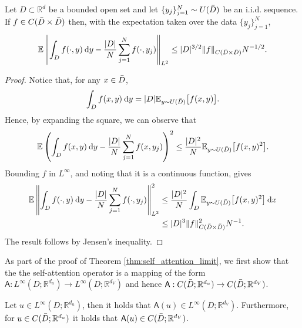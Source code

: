 \documentclass[twoside]{article}
\newcommand{\1}{\mathbbm{1}}
\newcommand{\R}{\mathbbm{R}}
\newcommand{\sA}{\mathsf{A}}
\providecommand{\mathbbm}{\mathbb} %
\newcommand{\E}{\mathbb{E}}
\begin{document}
\begin{lemma}
\label{lemma:expectation_of_l2}
Let \(D \subset \R^d\) be a bounded open set and let \(\{y_j\}_{j=1}^N \sim U(\Bar{D})\)
be an i.i.d. sequence. If \(f \in C(\Bar{D} \times \Bar{D})\)
then, with the expectation taken over the data \(\{y_j\}_{j=1}^N\),
\[ \E \left \| \int_D f(\cdot,y) \: \mathrm{d}y - \frac{|D|}{N} \sum_{j=1}^N f(\cdot,y_j) \right \|_{L^2} \leq |D|^{3/2} \|f\|_{C(\Bar{D} \times \Bar{D})} N^{-1/2}.\]
\end{lemma}
\begin{proof}
Notice that, for any \(x \in \Bar{D}\),
\[\int_D f(x,y) \: \mathrm{d}y  = |D| \E_{y \sim U(\Bar{D})} \big[ f(x,y) \big ].\]
Hence, by expanding the square, we can observe that
\[\E \left ( \int_D f(x,y) \: \mathrm{d}y - \frac{|D|}{N} \sum_{j=1}^N f(x,y_j) \right )^2 \leq \frac{|D|^2}{N} \E_{y \sim U(\Bar{D})} \big [ f(x,y)^2 \big ].\]
Bounding $f$ in $L^\infty$, and noting that it is a continuous function, gives
\begin{align*}
\E \left \| \int_D f(\cdot,y) \: \mathrm{d}y - \frac{|D|}{N} \sum_{j=1}^N f(\cdot,y_j) \right \|^2_{L^2} &\leq \frac{|D|^2}{N} \int_D \E_{y \sim U(\Bar{D})} \big [ f(x,y)^2 \big ] \: \mathrm{d}x \\
&\leq |D|^3 \|f\|^2_{C(\Bar{D} \times \Bar{D})} N^{-1} .
\end{align*}
The result follows by Jensen's inequality. 
\end{proof}
As part of the proof of Theorem \ref{thm:self_attention_limit}, we first show that the the self-attention operator is a mapping of the form $\sA: L^\infty (D;\R^{d_u}) \to L^\infty (D; \R^{d_V})$ and hence $\sA:C (\Bar{D};\R^{d_u}) \to C (\Bar{D}; \R^{d_V})$.
\begin{lemma}
\label{lemma:boundedness}
    Let $u\in L^\infty(D;\R^{d_u})$, then it holds that $\sA(u)\in L^\infty(D;\R^{d_V})$. Furthermore, for $u \in C (\Bar{D};\R^{d_u}) $ it holds that $\sA(u) \in C (\Bar{D};\R^{d_V})$.
\end{lemma}
\end{document}
